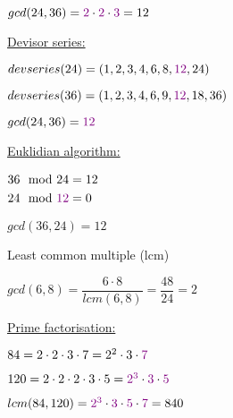 \documentclass[landscape, a4paper]{article}
\begin{document}
\begin{minipage}[t]{0.198\pagewidth}
\begin{betterlist}
\begin{betterlist}
\begin{betterlist}
\begin{betterlist}
				\end{betterlist}
				\item $gcd(24, 36) = \textcolor{PrimaryColor}{2}\cdot \textcolor{PrimaryColor}{2}\cdot \textcolor{PrimaryColor}{3} = 12$
			\end{betterlist}
			\item \underline{Devisor series:}
			\begin{betterlist}
				\item $devseries(24) = (1, 2, 3, 4, 6, 8, \textcolor{PrimaryColor}{12}, 24)$
				\item $devseries(36) = (1, 2, 3, 4, 6, 9, \textcolor{PrimaryColor}{12}, 18, 36)$
				\item $gcd(24, 36) = \textcolor{PrimaryColor}{12}$
			\end{betterlist}
			\item \underline{Euklidian algorithm:}
			\begin{betterlist}
				\item $\begin{aligned}[t]
						36\mod 24                           & = 12 \\
						24\mod \textcolor{PrimaryColor}{12} & = 0
					\end{aligned}$
				\item $gcd(36,24) = 12$
			\end{betterlist}
			\item \alert{Least common multiple (lcm)}
			\begin{betterlist}
				\item $gcd(6, 8) = \dfrac{6\cdot 8}{lcm(6, 8)} = \dfrac{48}{24} = 2$
			\end{betterlist}
			\begin{betterlist}
				\item \underline{Prime factorisation:}
				\begin{betterlist}
					\item $84 = 2\cdot 2\cdot 3\cdot 7 = 2^2\cdot 3\cdot \textcolor{PrimaryColor}{7}$
					\item $120 = 2\cdot 2\cdot 2\cdot 3\cdot 5= \textcolor{PrimaryColor}{2^3}\cdot \textcolor{PrimaryColor}{3}\cdot \textcolor{PrimaryColor}{5}$
					\item $lcm(84, 120) = \textcolor{PrimaryColor}{2^3}\cdot \textcolor{PrimaryColor}{3}\cdot\textcolor{PrimaryColor}{5}\cdot \textcolor{PrimaryColor}{7} = 840$
				\end{betterlist}
			\end{betterlist}
			\begin{betterlist}

\end{betterlist}
\end{betterlist}
\end{betterlist}
\end{minipage}
\end{document}
